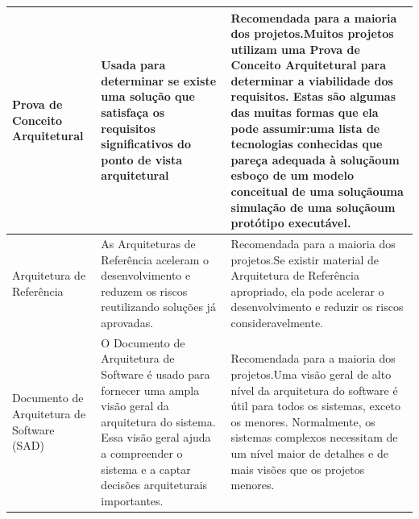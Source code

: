 \begin{longtable}{||p{3cm}|p{5cm}|p{5cm}||}
Prova de Conceito Arquitetural                     & Usada para determinar se existe uma solução que satisfaça os requisitos significativos do ponto de vista arquitetural                                                                                                                                                                                                                                                                                             & Recomendada para a maioria dos projetos.Muitos projetos utilizam uma Prova de Conceito Arquitetural para determinar a viabilidade dos requisitos. Estas são algumas das muitas formas que ela pode assumir:uma lista de tecnologias conhecidas que pareça adequada à soluçãoum esboço de um modelo conceitual de uma soluçãouma simulação de uma soluçãoum protótipo executável. \\ \hline
Arquitetura de Referência                          & As Arquiteturas de Referência aceleram o desenvolvimento e reduzem os riscos reutilizando soluções já aprovadas.                                                                                                                                                                                                                                                                                                  & Recomendada para a maioria dos projetos.Se existir material de Arquitetura de Referência apropriado, ela pode acelerar o desenvolvimento e reduzir os riscos consideravelmente.                                                                                                                                                                                                  \\ \hline
Documento de Arquitetura de Software (SAD)         & O Documento de Arquitetura de Software é usado para fornecer uma ampla visão geral da arquitetura do sistema. Essa visão geral ajuda a compreender o sistema e a captar decisões arquiteturais importantes.                                                                                                                                                                                                       & Recomendada para a maioria dos projetos.Uma visão geral de alto nível da arquitetura do software é útil para todos os sistemas, exceto os menores. Normalmente, os sistemas complexos necessitam de um nível maior de detalhes e de mais visões que os projetos menores.                                                                                                         \\ \hline
\end{longtable}

